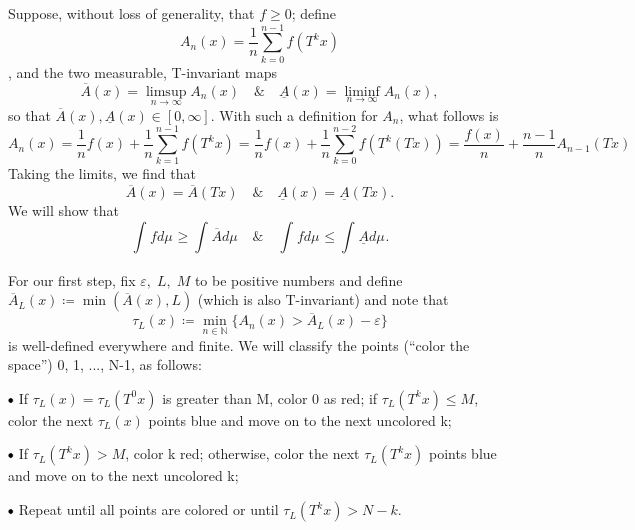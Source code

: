 \documentclass[../fractals_everywhere.tex]{subfiles}
\begin{document}
\begin{proof*}
	Suppose, without loss of generality, that \(f\geq 0\); define \[A_{n}(x) = \frac{1}{n}\sum\limits_{k=0}^{n-1}f(T^{k}x) \], and the two measurable, T-invariant maps
	\[
		\overline{A}(x) = \limsup_{n\to \infty}A_{n}(x) \quad\&\quad \underline{A}(x) = \liminf_{n\to \infty}A_{n}(x),
	\]
	so that \(\overline{A}(x), \underline{A}(x)\in [0, \infty]\). With such a definition for \(A_{n}\), what follows is
	\[
		A_{n}(x) = \frac{1}{n}f(x) + \frac{1}{n}\sum\limits_{k=1}^{n-1}f(T^{k}x)=\frac{1}{n}f(x) + \frac{1}{n}\sum\limits_{k=0}^{n-2}f(T^{k}(Tx))=\frac{f(x)}{n}+\frac{n-1}{n}A_{n-1}(Tx)
	\]
	Taking the limits, we find that
	\[
		\overline{A}(x) = \overline{A}(Tx) \quad\&\quad \underline{A}(x) = \underline{A}(Tx).
	\]
	We will show that
	\[
		\int_{}f d\mu_{} \geq \int_{}\overline{A} d\mu_{} \quad\&\quad \int_{}f d\mu_{}\leq \int_{}\underline{A} d\mu_{}.
	\]

	For our first step, fix \(\varepsilon,\; L,\; M\) to be positive numbers and define \(\overline{A}_{L}(x)\coloneqq \min\limits_{}(\overline{A}(x), L)\) (which is also T-invariant) and note that
	\[
		\tau_{L}(x)\coloneqq \min\limits_{n\in \mathbb{N}}\{A_{n}(x)>\overline{A}_{L}(x) - \varepsilon\}
	\]
	is well-defined everywhere and finite. We will classify the points (``color the space'') 0, 1, ..., N-1, as follows:

	\(\tikz[baseline=-0.5ex]\draw[black, fill=black, radius=1.5pt](0, 0)circle;\) If \(\tau_{L}(x) = \tau_{L}(T^{0}x)\) is greater than M, color 0 as red; if \(\tau_{L}(T^{k}x)\leq M\), color the next \(\tau_{L}(x)\) points blue and move on to the next uncolored k;

	\(\tikz[baseline=-0.5ex]\draw[black, fill=black, radius=1.5pt](0, 0)circle;\) If \(\tau_{L}(T^{k}x) > M\), color k red; otherwise, color the next \(\tau_{L}(T^{k}x)\) points blue and move on to the next uncolored k;

	\(\tikz[baseline=-0.5ex]\draw[black, fill=black, radius=1.5pt](0, 0)circle;\) Repeat until all points are colored or until \(\tau_{L}(T^{k}x) > N - k.\)


\end{proof*}
\end{document}
